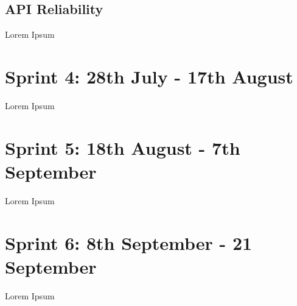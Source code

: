 \subsection{API Reliability}
Lorem Ipsum

\section{Sprint 4: 28th July - 17th August}
Lorem Ipsum

\section{Sprint 5: 18th August - 7th September}
Lorem Ipsum

\section{Sprint 6: 8th September - 21 September}
Lorem Ipsum